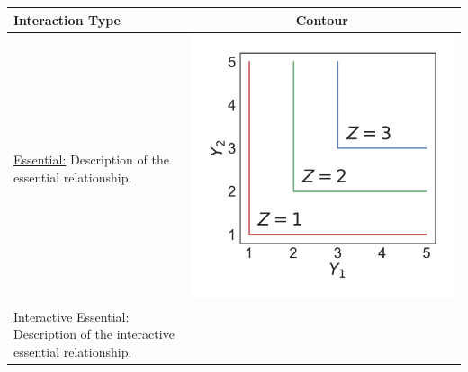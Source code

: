 \begin{table}[h!]
  \centering
  \begin{tabular}{m{} c}
    \hline
    \textbf{Interaction Type} & \textbf{Contour}\\ \hline
    \uline{Essential:} Description of the essential relationship.
    &
    \begin{minipage}{.175\textwidth}
      \includegraphics[width=.975\textwidth, height=.975\textwidth]{Figures/Essential.pdf}
    \end{minipage}
    \\ 
    \uline{Interactive Essential:} Description of the interactive essential relationship.
    &
    \begin{minipage}{.175\textwidth}

\end{minipage}
\end{tabular}
\end{table}
